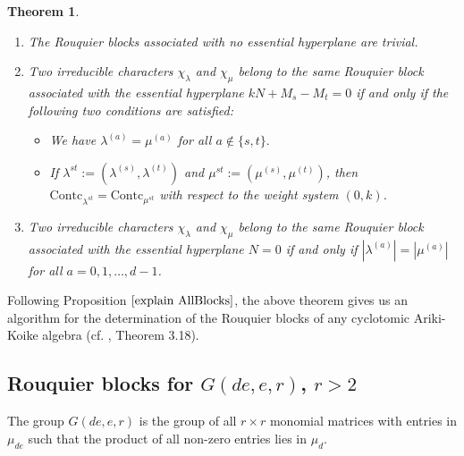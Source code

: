 \documentclass[10pt,a4paper,titlepage]{article}
\newtheorem{theorem}{Theorem}[section]
\newcommand{\el}{\lambda}
\begin{document}
\begin{theorem}\label{combination}\
\begin{enumerate}
\item The Rouquier blocks associated with no essential hyperplane are trivial.
\item Two irreducible characters $\chi_\el$ and $\chi_\mu$ belong to the same Rouquier block associated with the essential hyperplane $kN+M_s-M_t=0$  if and only if the following two conditions are satisfied:
\begin{itemize}
\item We have $\el^{(a)}=\mu^{(a)}$ for all $a \notin \{s,t\}.$
\item If $\el^{st}:=(\el^{(s)},\el^{(t)})$ and $\mu^{st}:=(\mu^{(s)},\mu^{(t)})$, then
$\mathrm{Contc}_{\el^{st}}= \mathrm{Contc}_{\mu^{st}}$ with respect to the weight system $(0,k)$.
\end{itemize}
\item Two irreducible characters $\chi_\el$ and $\chi_\mu$ belong to the same Rouquier block associated with the essential hyperplane $N=0$  if and only if  $|\lambda^{(a)}|=|\mu^{(a)}|$ for all $a=0,1,\ldots,d-1$. 
\end{enumerate}
\end{theorem}

Following Proposition $\ref{explain AllBlocks}$, the above theorem gives us an algorithm for the determination of the Rouquier blocks of any cyclotomic Ariki-Koike algebra (cf. \cite{Chlou2}, Theorem 3.18).

\subsection {Rouquier blocks for $G(de,e,r)$, $r>2$}

The group $G(de,e,r)$ is the group of all  $r \times r$ monomial matrices with entries in $\mu_{de}$  such that the product of all non-zero entries lies in $\mu_d$.
\end{document}
